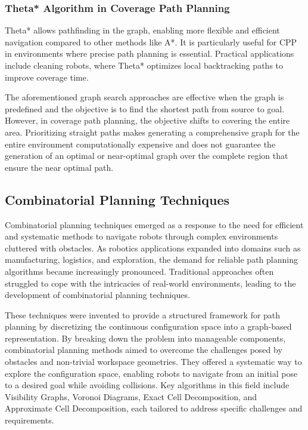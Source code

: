 \subsubsection{Theta* Algorithm in Coverage Path Planning}

Theta* allows pathfinding in the graph, enabling more flexible and efficient navigation compared to other methods like A*. It is particularly useful for CPP in environments where precise path planning is essential. Practical applications include cleaning robots, where Theta* optimizes local backtracking paths to improve coverage time.


\vspace*{6mm} 
 
The aforementioned graph search approaches are effective when the graph is predefined and the objective is to find the shortest path from source to goal. However, in coverage path planning, the objective shifts to covering the entire area. Prioritizing straight paths makes generating a comprehensive graph for the entire environment computationally expensive  and does not guarantee the generation of an optimal or near-optimal graph over the complete region that ensure the near optimal path. 



\subsection{Combinatorial Planning Techniques}

Combinatorial planning techniques emerged as a response to the need for efficient and systematic
methods to navigate robots through complex environments cluttered with obstacles. As robotics
applications expanded into domains such as manufacturing, logistics, and exploration, the
demand for reliable path planning algorithms became increasingly pronounced. Traditional
approaches often struggled to cope with the intricacies of real-world environments, leading to
the development of combinatorial planning techniques.

\vspace*{6mm} 
 

These techniques were invented to provide a structured framework for path planning by
discretizing the continuous configuration space into a graph-based representation. By breaking
down the problem into manageable components, combinatorial planning methods aimed to
overcome the challenges posed by obstacles and non-trivial workspace geometries. They offered a systematic way to explore the configuration space, enabling robots to navigate from an initial
pose to a desired goal while avoiding collisions. Key algorithms in this field include Visibility Graphs, Voronoi Diagrams, Exact Cell Decomposition, and Approximate Cell Decomposition, each tailored to address specific challenges and requirements.


